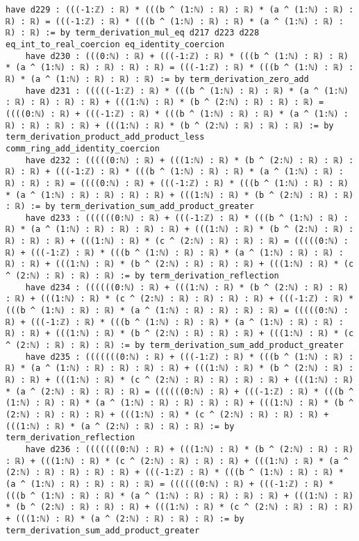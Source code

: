 \documentclass{article}
\begin{document}
\begin{tcolorbox}[colback=white!10, width=\linewidth]
\begin{lstlisting}[language=Lean4]
    have d229 : (((-1:ℤ) : ℝ) * (((b ^ (1:ℕ) : ℝ) : ℝ) * (a ^ (1:ℕ) : ℝ) : ℝ) : ℝ) = (((-1:ℤ) : ℝ) * (((b ^ (1:ℕ) : ℝ) : ℝ) * (a ^ (1:ℕ) : ℝ) : ℝ) : ℝ) := by term_derivation_mul_eq d217 d223 d228 eq_int_to_real_coercion eq_identity_coercion
    have d230 : (((0:ℕ) : ℝ) + (((-1:ℤ) : ℝ) * (((b ^ (1:ℕ) : ℝ) : ℝ) * (a ^ (1:ℕ) : ℝ) : ℝ) : ℝ) : ℝ) = (((-1:ℤ) : ℝ) * (((b ^ (1:ℕ) : ℝ) : ℝ) * (a ^ (1:ℕ) : ℝ) : ℝ) : ℝ) := by term_derivation_zero_add
    have d231 : (((((-1:ℤ) : ℝ) * (((b ^ (1:ℕ) : ℝ) : ℝ) * (a ^ (1:ℕ) : ℝ) : ℝ) : ℝ) : ℝ) + (((1:ℕ) : ℝ) * (b ^ (2:ℕ) : ℝ) : ℝ) : ℝ) = ((((0:ℕ) : ℝ) + (((-1:ℤ) : ℝ) * (((b ^ (1:ℕ) : ℝ) : ℝ) * (a ^ (1:ℕ) : ℝ) : ℝ) : ℝ) : ℝ) + (((1:ℕ) : ℝ) * (b ^ (2:ℕ) : ℝ) : ℝ) : ℝ) := by term_derivation_product_add_product_less comm_ring_add_identity_coercion
    have d232 : (((((0:ℕ) : ℝ) + (((1:ℕ) : ℝ) * (b ^ (2:ℕ) : ℝ) : ℝ) : ℝ) : ℝ) + (((-1:ℤ) : ℝ) * (((b ^ (1:ℕ) : ℝ) : ℝ) * (a ^ (1:ℕ) : ℝ) : ℝ) : ℝ) : ℝ) = ((((0:ℕ) : ℝ) + (((-1:ℤ) : ℝ) * (((b ^ (1:ℕ) : ℝ) : ℝ) * (a ^ (1:ℕ) : ℝ) : ℝ) : ℝ) : ℝ) + (((1:ℕ) : ℝ) * (b ^ (2:ℕ) : ℝ) : ℝ) : ℝ) := by term_derivation_sum_add_product_greater
    have d233 : ((((((0:ℕ) : ℝ) + (((-1:ℤ) : ℝ) * (((b ^ (1:ℕ) : ℝ) : ℝ) * (a ^ (1:ℕ) : ℝ) : ℝ) : ℝ) : ℝ) + (((1:ℕ) : ℝ) * (b ^ (2:ℕ) : ℝ) : ℝ) : ℝ) : ℝ) + (((1:ℕ) : ℝ) * (c ^ (2:ℕ) : ℝ) : ℝ) : ℝ) = (((((0:ℕ) : ℝ) + (((-1:ℤ) : ℝ) * (((b ^ (1:ℕ) : ℝ) : ℝ) * (a ^ (1:ℕ) : ℝ) : ℝ) : ℝ) : ℝ) + (((1:ℕ) : ℝ) * (b ^ (2:ℕ) : ℝ) : ℝ) : ℝ) + (((1:ℕ) : ℝ) * (c ^ (2:ℕ) : ℝ) : ℝ) : ℝ) := by term_derivation_reflection
    have d234 : ((((((0:ℕ) : ℝ) + (((1:ℕ) : ℝ) * (b ^ (2:ℕ) : ℝ) : ℝ) : ℝ) + (((1:ℕ) : ℝ) * (c ^ (2:ℕ) : ℝ) : ℝ) : ℝ) : ℝ) + (((-1:ℤ) : ℝ) * (((b ^ (1:ℕ) : ℝ) : ℝ) * (a ^ (1:ℕ) : ℝ) : ℝ) : ℝ) : ℝ) = (((((0:ℕ) : ℝ) + (((-1:ℤ) : ℝ) * (((b ^ (1:ℕ) : ℝ) : ℝ) * (a ^ (1:ℕ) : ℝ) : ℝ) : ℝ) : ℝ) + (((1:ℕ) : ℝ) * (b ^ (2:ℕ) : ℝ) : ℝ) : ℝ) + (((1:ℕ) : ℝ) * (c ^ (2:ℕ) : ℝ) : ℝ) : ℝ) := by term_derivation_sum_add_product_greater
    have d235 : (((((((0:ℕ) : ℝ) + (((-1:ℤ) : ℝ) * (((b ^ (1:ℕ) : ℝ) : ℝ) * (a ^ (1:ℕ) : ℝ) : ℝ) : ℝ) : ℝ) + (((1:ℕ) : ℝ) * (b ^ (2:ℕ) : ℝ) : ℝ) : ℝ) + (((1:ℕ) : ℝ) * (c ^ (2:ℕ) : ℝ) : ℝ) : ℝ) : ℝ) + (((1:ℕ) : ℝ) * (a ^ (2:ℕ) : ℝ) : ℝ) : ℝ) = ((((((0:ℕ) : ℝ) + (((-1:ℤ) : ℝ) * (((b ^ (1:ℕ) : ℝ) : ℝ) * (a ^ (1:ℕ) : ℝ) : ℝ) : ℝ) : ℝ) + (((1:ℕ) : ℝ) * (b ^ (2:ℕ) : ℝ) : ℝ) : ℝ) + (((1:ℕ) : ℝ) * (c ^ (2:ℕ) : ℝ) : ℝ) : ℝ) + (((1:ℕ) : ℝ) * (a ^ (2:ℕ) : ℝ) : ℝ) : ℝ) := by term_derivation_reflection
    have d236 : (((((((0:ℕ) : ℝ) + (((1:ℕ) : ℝ) * (b ^ (2:ℕ) : ℝ) : ℝ) : ℝ) + (((1:ℕ) : ℝ) * (c ^ (2:ℕ) : ℝ) : ℝ) : ℝ) + (((1:ℕ) : ℝ) * (a ^ (2:ℕ) : ℝ) : ℝ) : ℝ) : ℝ) + (((-1:ℤ) : ℝ) * (((b ^ (1:ℕ) : ℝ) : ℝ) * (a ^ (1:ℕ) : ℝ) : ℝ) : ℝ) : ℝ) = ((((((0:ℕ) : ℝ) + (((-1:ℤ) : ℝ) * (((b ^ (1:ℕ) : ℝ) : ℝ) * (a ^ (1:ℕ) : ℝ) : ℝ) : ℝ) : ℝ) + (((1:ℕ) : ℝ) * (b ^ (2:ℕ) : ℝ) : ℝ) : ℝ) + (((1:ℕ) : ℝ) * (c ^ (2:ℕ) : ℝ) : ℝ) : ℝ) + (((1:ℕ) : ℝ) * (a ^ (2:ℕ) : ℝ) : ℝ) : ℝ) := by term_derivation_sum_add_product_greater

\end{lstlisting}
\end{tcolorbox}
\end{document}
